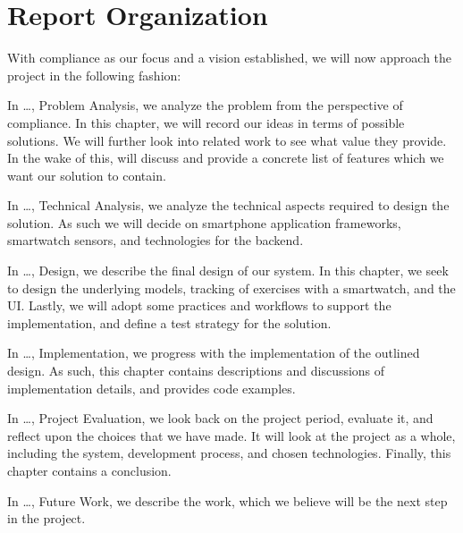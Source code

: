 \section{Report Organization}
With compliance as our focus and a vision established, we will now approach the project in the following fashion:

In \ldots, Problem Analysis, we analyze the problem from the perspective of compliance. In this chapter, we will record our ideas in terms of possible solutions. We will further look into related work to see what value they provide. In the wake of this, will discuss and provide a concrete list of features which we want our solution to contain.

In \ldots, Technical Analysis, we analyze the technical aspects required to design the solution. As such we will decide on smartphone application frameworks, smartwatch sensors, and technologies for the backend.

In \ldots, Design, we describe the final design of our system. In this chapter, we seek to design the underlying models, tracking of exercises with a smartwatch, and the UI. Lastly, we will adopt some practices and workflows to support the implementation, and define a test strategy for the solution.

In \ldots, Implementation, we progress with the implementation of the outlined design. As such, this chapter contains descriptions and discussions of implementation details, and provides code examples.

In \ldots, Project Evaluation, we look back on the project period, evaluate it, and reflect upon the choices that we have made. It will look at the project as a whole, including the system, development process, and chosen technologies. Finally, this chapter contains a conclusion.

In \ldots, Future Work, we describe the work, which we believe will be the next step in the project.
